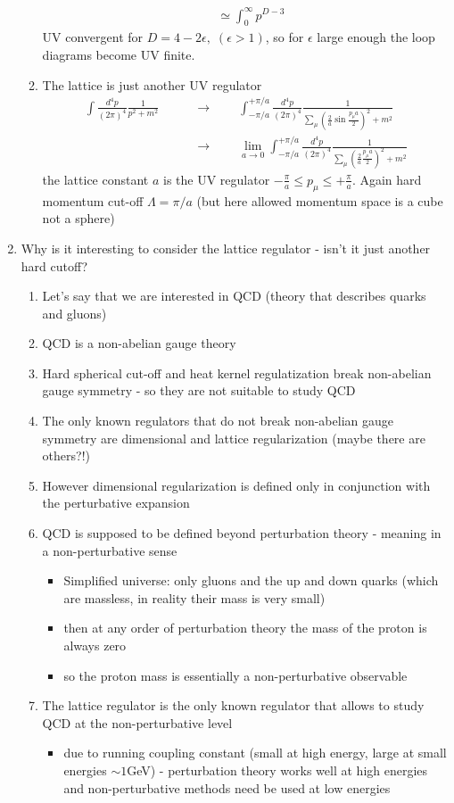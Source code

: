 \documentclass[10pt,a4paper]{article}
\theoremstyle{definition}
\begin{document}
\begin{enumerate}
\begin{enumerate}
\begin{align}
&\simeq\int_0^\infty p^{D-3}
\end{align}
UV convergent for $D=4-2\epsilon,\;(\epsilon>1)$, so for $\epsilon$ large enough the loop diagrams become UV finite.
\item The lattice is just another UV regulator
\begin{align}
\int \frac{d^4p}{(2\pi)^4}\frac{1}{p^2+m^2}
\qquad&\rightarrow\qquad\int_{-\pi/a}^{+\pi/a} \frac{d^4p}{(2\pi)^4}\frac{1}{\sum_\mu \left(\frac{2}{a}\sin\frac{p_\mu a}{2}\right)^2+m^2}\\
\qquad&\rightarrow\qquad\lim_{a\rightarrow 0 }\int_{-\pi/a}^{+\pi/a} \frac{d^4p}{(2\pi)^4}\frac{1}{\sum_\mu \left(\frac{2}{a}\frac{p_\mu a}{2}\right)^2+m^2}
\end{align}
the lattice constant $a$ is the UV regulator $-\frac{\pi}{a}\le p_\mu\le+\frac{\pi}{a}$. Again hard momentum cut-off $\Lambda=\pi/a$ (but here allowed momentum space is a cube not a sphere)
\end{enumerate}
\item Why is it interesting to consider the lattice regulator - isn't it just another hard cutoff?
\begin{enumerate}
\item Let's say that we are interested in QCD (theory that describes quarks and gluons)
\item QCD is a non-abelian gauge theory
\item Hard spherical cut-off and heat kernel regulatization break non-abelian gauge symmetry - so they are not suitable to study QCD
\item The only known regulators that do not break non-abelian gauge symmetry are dimensional and lattice regularization (maybe there are others?!)
\item However dimensional regularization is defined only in conjunction with the  perturbative expansion
\item QCD is supposed to be defined beyond perturbation theory - meaning in a non-perturbative sense
\begin{itemize}
\item Simplified universe: only gluons and the up and down quarks (which are massless, in reality their mass is very small)
\item then at any order of perturbation theory the mass of the proton is always zero
\item so the proton mass is essentially a non-perturbative observable
\end{itemize}
\item The lattice regulator is the only known regulator that allows to study QCD at the non-perturbative level
\begin{itemize}
\item due to running coupling constant (small at high energy, large at small energies $\sim1$GeV) - perturbation theory works well at high energies and non-perturbative methods need be used at low energies
\end{itemize}
\end{enumerate}
\end{enumerate}
\end{document}
